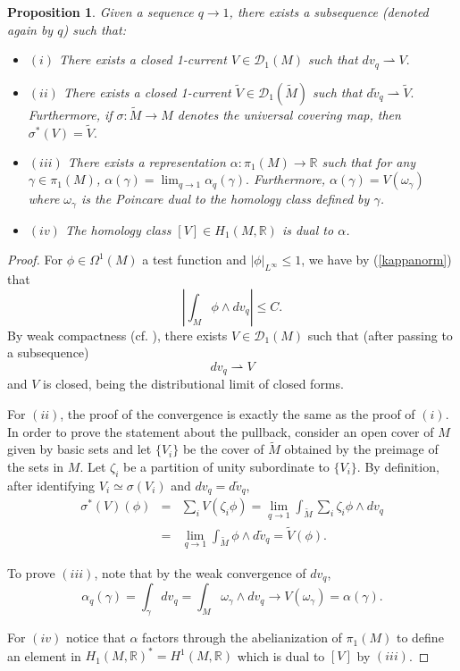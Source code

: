 \documentclass{ip-journal}
\newtheorem{proposition}[theorem]{Proposition}
\theoremstyle{definition}
\numberwithin{equation}{section}
\newcommand{\R}{\mathbb R}
\begin{document}
\begin{proposition} \label{lemma:limmeasures0} Given a sequence $q \rightarrow 1$, there exists a subsequence (denoted again by $q$) such that:
\begin{itemize}
\item $(i)$ There exists a closed  1-current $ V \in \mathcal D_1( M)$ such that 
$dv_q \rightharpoonup  V.$\\
\item $(ii)$ There exists a closed  1-current $ \tilde V \in \mathcal D_1( \tilde M)$ such that 
$d\tilde v_q \rightharpoonup  \tilde V.$ Furthermore, if $\sigma: \tilde M \rightarrow M$ denotes the universal covering map, then
$\sigma^*(V)= \tilde V.$\\
\item $(iii)$ There exists a representation 
$\alpha: \pi_1(M) \rightarrow \R$
such that for any $\gamma \in \pi_1(M)$,
$\alpha(\gamma)=\lim_{q \rightarrow 1} \alpha_q(\gamma).$
Furthermore,
$\alpha(\gamma)=   V( \omega_\gamma)$
 where $\omega_\gamma$ is the Poincare dual to the homology class defined by $\gamma$.
 \item $(iv)$ The homology class $[V] \in H_1(M, \R)$ is dual to $\alpha$.
 \end{itemize}
 \end{proposition}
\begin{proof} 
For $\phi \in  \Omega^1(M)$ a test function and $|\phi|_{L^\infty} \leq 1$, we have by (\ref{kappanorm}) that
\[
  \left | \int_M \phi \wedge dv_q  \right |  \leq C.
\]
  By weak compactness (cf. \cite[Lemma 2.15]{simon}), there exists  $V \in  \mathcal D_1( M)$ such that (after passing to a subsequence)
  \[
  dv_q \rightharpoonup  V 
  \]
  and $V$ is closed, being the  distributional limit of closed forms. 

For $(ii)$, the proof of the convergence is exactly the same as the proof of $(i)$. In order to prove the statement about the pullback, 
consider an open cover of $M$ given by basic sets and let $ \{ V_i \}$ be the cover of $\tilde M$ obtained by the preimage of the sets in $M$. Let $\zeta_i$ be a partition of unity subordinate to $ \{ V_i \}$. By definition, after identifying $V_i \simeq \sigma (V_i)$ and $dv_q= d\tilde v_q$,
\begin{eqnarray*}
\sigma^*(V)(\phi)&=&\sum_i  V(\zeta_i \phi)
= \lim_{q \rightarrow 1} \int_{\tilde M}  \sum_i \zeta_i \phi \wedge dv_q\\
&= & \lim_{q \rightarrow 1} \int_{\tilde M}   \phi \wedge d \tilde v_q
=  \tilde V(\phi).
\end{eqnarray*}




To prove $(iii)$, note that by the weak convergence of $dv_q$,
\[
\alpha_q(\gamma)= \int_\gamma  dv_q =\int_M  \omega_\gamma \wedge dv_q  \rightarrow  V( \omega_\gamma) =\alpha(\gamma).
\]

For  $(iv)$ notice that $\alpha$ factors through the abelianization of $\pi_1(M)$ to define an element in $H_1(M, \R)^*=H^1(M, \R)$ which is dual to $[V]$ by $(iii)$.
\end{proof}
\end{document}
